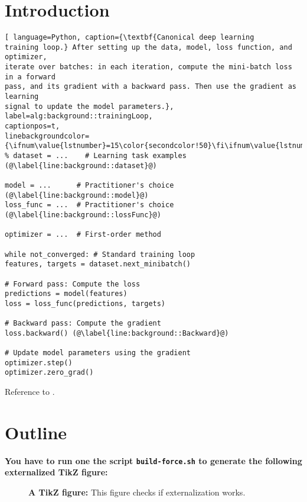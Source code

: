 \section{Introduction}\label{sec:introduction}

\Blindtext

\begin{lstlisting}[ language=Python, caption={\textbf{Canonical deep learning
training loop.} After setting up the data, model, loss function, and optimizer,
iterate over batches: in each iteration, compute the mini-batch loss in a forward
pass, and its gradient with a backward pass. Then use the gradient as learning
signal to update the model parameters.}, label=alg:background::trainingLoop,
captionpos=t,
linebackgroundcolor={\ifnum\value{lstnumber}=15\color{secondcolor!50}\fi\ifnum\value{lstnumber}=16\color{secondcolor!50}\fi}]
% dataset = ...    # Learning task examples (@\label{line:background::dataset}@)

model = ...      # Practitioner's choice (@\label{line:background::model}@)
loss_func = ...  # Practitioner's choice (@\label{line:background::lossFunc}@)

optimizer = ...  # First-order method

while not_converged: # Standard training loop
features, targets = dataset.next_minibatch()

# Forward pass: Compute the loss
predictions = model(features)
loss = loss_func(predictions, targets)

# Backward pass: Compute the gradient
loss.backward() (@\label{line:background::Backward}@)

# Update model parameters using the gradient
optimizer.step()
optimizer.zero_grad()
\end{lstlisting}

Reference to .

\section{Outline}
\Blindtext

\textbf{You have to run one the script \texttt{build-force.sh} to generate the
  following externalized TikZ figure:}

\begin{figure}[!h]
  \centering
  \tikzexternalenable
  \tikzexternaldisable
  \caption{\textbf{A TikZ figure:} This figure checks if externalization works.}
\end{figure}

